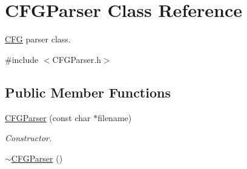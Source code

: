 \hypertarget{class_c_f_g_parser}{\section{\-C\-F\-G\-Parser \-Class \-Reference}
\label{class_c_f_g_parser}
}


\hyperlink{class_c_f_g}{\-C\-F\-G} parser class.  




{\ttfamily \#include $<$\-C\-F\-G\-Parser.\-h$>$}

\subsection*{\-Public \-Member \-Functions}
\begin{DoxyCompactItemize}
\item 
\hyperlink{class_c_f_g_parser_a17da873f1516daecae94e5ee4b6d2b19}{\-C\-F\-G\-Parser} (const char $\ast$filename)
\begin{DoxyCompactList}\small\item\em \-Constructor. \end{DoxyCompactList}\item 
\hypertarget{class_c_f_g_parser_a6afd8d2e7f4ad6512af524880a339403}{\hyperlink{class_c_f_g_parser_a6afd8d2e7f4ad6512af524880a339403}{$\sim$\-C\-F\-G\-Parser} ()}\label{class_c_f_g_parser_a6afd8d2e7f4ad6512af524880a339403}


\end{DoxyCompactItemize}
